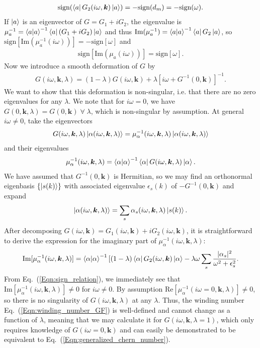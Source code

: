 \documentclass[english]{scrartcl}
\newcommand{\eq}[1]{Eq.~(\ref{#1})}
\begin{document}
\begin{align}
\text{sign} (\bra{a} G_2(i \omega, \bm k) \ket{a}) = -\text{sign} (d_m) = -\text{sign} (\omega). \label{Eqn:sign_relation} 
\end{align}
If $\ket{a}$ is an eigenvector of  $G = G_1 + i G_2$, the eigenvalue is $\mu_a^{-1} = \braket{a|a}^{-1} \bra{a} (G_1 + i G_2) \ket{a}$ and thus  $\text{Im} (\mu_a^{-1}) = \braket{a|a}^{-1} \bra{a} G_2 \ket{a}$, so $\text{sign} [\text{Im} (\mu_a^{-1}(i\omega))] = -\text{sign} [\omega]$ and 
\begin{align}
\text{sign} [\text{Im} (\mu_a(i\omega))] = \text{sign} [\omega].
\end{align}
Now we introduce a smooth deformation of $G$ by 
\begin{align}
G(i \omega, \bm k,\lambda) = (1- \lambda)  G(i \omega, \bm k) +  \lambda[i\omega + G^{-1}(0, \bm k)]^{-1}.  \label{Eqn:deformation_i_omega}
\end{align}
We want to show that this deformation is non-singular, i.e. that there are no zero eigenvalues for any $\lambda$. We note that for $i\omega = 0$, we have $G(0, \bm k,\lambda) = G(0, \bm k) \; \forall \; \lambda$, which is non-singular by assumption. At general $i \omega \neq 0$, take the eigenvectors 
\begin{align*}
G(i \omega, \bm k,\lambda) \ket{\alpha(i \omega, \bm k, \lambda)} = \mu_\alpha^{-1}(i \omega, \bm k, \lambda) \ket{\alpha(i \omega, \bm k, \lambda)} 
\end{align*}
and their eigenvalues
\begin{align*}
\mu_\alpha^{-1}(i \omega, \bm k, \lambda) = \braket{\alpha|\alpha}^{-1}  \bra{\alpha} G(i \omega, \bm k,\lambda) \ket{\alpha}.
\end{align*}
We have assumed that $G^{-1}(0, \bm k)$ is Hermitian, so we may find an orthonormal eigenbasis $\{\ket{s(k)}\}$ with associated eigenvalue $\epsilon_s(k)$ of  $-G^{-1}(0, \bm k)$ and expand
\begin{align*}
\ket{\alpha(i \omega, \bm k, \lambda)}  = \sum_s \alpha_s(i \omega, \bm k, \lambda) \ket{s(k)}.
\end{align*}
After decomposing $G(i \omega, \bm k) = G_1(i \omega, \bm k) + i G_2(i \omega, \bm k)$, it is straightforward to derive the expression for the imaginary part of $\mu_\alpha^{-1}(i \omega, \bm k, \lambda)$:
\begin{align*}
\text{Im}[\mu_\alpha^{-1}(i \omega, \bm k, \lambda)] = \braket{\alpha|\alpha}^{-1} [(1- \lambda) \bra{\alpha} G_2(i \omega, \bm k) \ket{\alpha} - \lambda \omega \sum_s \frac{|\alpha_s|^2}{\omega^2 + \epsilon_s^2}.
\end{align*}
From \eq{Eqn:sign_relation}, we immediately see that $\text{Im}[\mu_\alpha^{-1}(i \omega, \bm k, \lambda)] \neq 0$ for $i\omega \neq 0$. By assumption $\text{Re}[\mu_\alpha^{-1}(i \omega = 0, \bm k, \lambda)] \neq 0$, so there is no singularity of $G(i \omega, \bm k,\lambda)$ at any $\lambda$. Thus, the winding number \eq{Eqn:winding_number_GF} is well-defined and cannot change as a function of $\lambda$, meaning that we may calculate it for $G(i \omega, \bm k,\lambda = 1)$, which only requires knowledge of $G(i \omega = 0, \bm k)$ and can easily be demonstrated to be equivalent to \eq{Eqn:generalized_chern_number}. 
\end{document}
